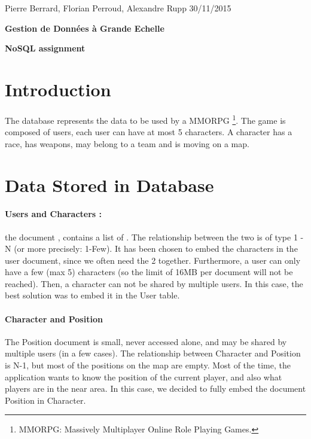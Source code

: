\documentclass[a4paper, 11pt]{article}
\begin{document}
\noindent
Pierre Berrard, Florian Perroud, Alexandre Rupp  \hfill 30/11/2015 
\vspace{-0.3cm}\\

{\LARGE 
\begin{center}
\textbf{Gestion de Données à Grande Echelle} \\
\vspace{0.2cm}
\end{center}
}
\begin{center}
\textbf{NoSQL assignment} \\
\end{center}



\section{Introduction}
The database represents the data to be used by a MMORPG \footnote{MMORPG: Massively Multiplayer Online Role Playing Games.}.
The game is composed of users, each user can have at most 5 characters. A character has a race, has weapons, may belong to a team and is moving on a map.

\section{Data Stored in Database}

\paragraph{Users and Characters :} the document , contains a list of . The relationship between the two is of type 1 - N (or more precisely: 1-Few). It has been chosen to embed the characters in the user document, since we often need the 2 together. Furthermore, a user can only have a few (max 5) characters (so the limit of 16MB per document will not be reached). Then, a character can not be shared by multiple users. In this case, the best solution was to embed it in the User table.

\paragraph{Character and Position\\}
The Position document is small, never accessed alone, and may be shared by multiple users (in a few cases). The relationship between Character and Position is N-1, but most of the positions on the map are empty. Most of the time, the application wants to know the position of the current player, and also what players are in the near area. In this case, we decided to fully embed the document Position in Character.
\end{document}
